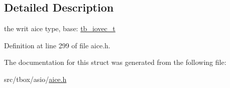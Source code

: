 \subsection{Detailed Description}
the writ aice type, base\-: \hyperlink{structtb__iovec__t}{tb\-\_\-iovec\-\_\-t} 

Definition at line 299 of file aice.\-h.



The documentation for this struct was generated from the following file\-:\begin{DoxyCompactItemize}
\item 
src/tbox/asio/\hyperlink{aice_8h}{aice.\-h}\end{DoxyCompactItemize}
